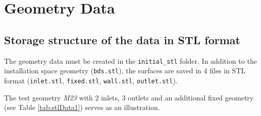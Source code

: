 \documentclass[a4paper,oneside]{book}
\numberwithin{equation}{section}
\begin{document}

\chapter{Geometry Data}

\section{Storage structure of the data in STL format}
The geometry data must be created in the \verb|initial_stl| folder. In addition to the installation space geometry (\texttt{bds.stl}), the surfaces are saved in 4 files in STL format (\texttt{inlet.stl}, \texttt{fixed.stl}, \texttt{wall.stl}, \texttt{outlet.stl}).

The test geometry \textit{M23} with 2 inlets, 3 outlets and an additional fixed geometry (see Table \ref{tab:stlData1}) serves as an illustration.
\end{document}
